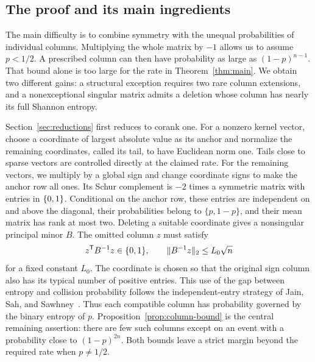 \subsection{The proof and its main ingredients}

The main difficulty is to combine symmetry with the unequal probabilities
of individual columns. Multiplying the whole matrix by $-1$ allows us to
assume $p<1/2$. A prescribed column can then have probability as large as
$(1-p)^{n-1}$. That bound alone is too large for the rate in
Theorem~\ref{thm:main}. We obtain two different gains: a structural
exception requires two rare column extensions, and a nonexceptional
singular matrix admits a deletion whose column has nearly its full
Shannon entropy.

Section~\ref{sec:reductions} first reduces to corank one. For a nonzero
kernel vector, choose a coordinate of largest absolute value as its anchor and normalize
the remaining coordinates, called its tail, to have Euclidean norm one.
Tails close to sparse vectors are controlled directly at the claimed
rate. For the remaining vectors, we multiply by a global sign and change
coordinate signs to make the anchor row all ones. Its Schur complement
is $-2$ times a symmetric matrix with entries in $\{0,1\}$.
Conditional on the anchor row, these entries are
independent on and above the diagonal, their probabilities belong to
$\{p,1-p\}$, and their mean matrix has rank at most two. Deleting a
suitable coordinate gives a nonsingular principal minor $B$. The omitted
column $z$ must satisfy
\[
 z^{\mathsf T}B^{-1}z\in\{0,1\},
 \qquad \lVert B^{-1}z\rVert_2\le L_0\sqrt n
\]
for a fixed constant $L_0$. The coordinate is chosen so that the original
sign column also has its typical number of positive entries. This use
of the gap between entropy and collision probability follows the
independent-entry strategy of Jain, Sah, and Sawhney~\cite[Section~6]{JainSahSawhneyDiscrete}. Thus each
compatible column has probability governed by the binary entropy of $p$.
Proposition~\ref{prop:column-bound} is the central remaining assertion:
there are few such columns except on an event with a probability close
to $(1-p)^{2n}$. Both bounds leave a strict margin beyond the required
rate when $p\ne1/2$.

